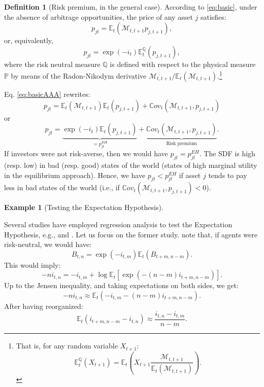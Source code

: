 \documentclass[
  12pt,
]{book}
\theoremstyle{definition}
\newtheorem{definition}{Definition}[chapter]
\theoremstyle{definition}
\newtheorem{example}{Example}[chapter]
\theoremstyle{definition}
\theoremstyle{definition}
\theoremstyle{remark}
\begin{document}
\begin{definition}[Risk premium, in the general case]
\protect\hypertarget{def:RPremium}{}\label{def:RPremium}According to \eqref{eq:basic}, under the absence of arbitrage opportunities, the price of any asset \(j\) satisfies:
\begin{equation}
p_{jt} = \mathbb{E}_t(\mathcal{M}_{t,t+1} p_{j,t+1}),\label{eq:basicAAA}
\end{equation}
or, equivalently,
\[
p_{jt} = \exp(-i_t)\mathbb{E}^{\mathbb{Q}}_t(p_{j,t+1}),
\]
where the risk neutral measure \(\mathbb{Q}\) is defined with respect to the physical measure \(\mathbb{P}\) by means of the Radon-Nikodym derivative \(\mathcal{M}_{t,t+1}\big/\mathbb{E}_t(\mathcal{M}_{t,t+1})\).\footnote{That is, for any random variable \(X_{t+1}\):
  \[
  \mathbb{E}^{\mathbb{Q}}_t(X_{t+1})=\mathbb{E}_t\left(X_{t+1}\frac{\mathcal{M}_{t,t+1}}{\mathbb{E}_t(\mathcal{M}_{t,t+1})}\right).
  \]}

Eq. \eqref{eq:basicAAA} rewrites:
\[
p_{jt} =  \mathbb{E}_t(\mathcal{M}_{t,t+1})\mathbb{E}_t( p_{j,t+1}) + \mathbb{C}ov_t(\mathcal{M}_{t,t+1}, p_{j,t+1})
\]
or
\begin{equation}
p_{jt} = \underbrace{\exp(-i_t)\mathbb{E}_t( p_{j,t+1})}_{=p^{EH}_{jt}} + \underbrace{\mathbb{C}ov_t(\mathcal{M}_{t,t+1}, p_{j,t+1})}_{\mbox{Risk premium}}.\label{eq:CovRP}
\end{equation}
If investors were not risk-averse, then we would have \(p_{jt} = p^{EH}_{jt}\). The SDF is high (resp. low) in bad (resp. good) states of the world (states of high marginal utility in the equilibrium approach). Hence, we have \(p_{jt}< p^{EH}_{jt}\) if asset \(j\) tends to pay less in bad states of the world (i.e., if \(\mathbb{C}ov_t(\mathcal{M}_{t,t+1}, p_{j,t+1})<0\)).
\end{definition}

\begin{example}[Testing the Expectation Hypothesis]
\protect\hypertarget{exm:TestingEH}{}\label{exm:TestingEH}

Several studies have employed regression analysis to test the Expectation Hypothesis, e.g., \citet{Campbell_Shiller_1991} and \citet{Cochrane_Piazzesi_2005}. Let us focus on the former study. \citet{Campbell_Shiller_1991} note that, if agents were risk-neutral, we would have:
\[
B_{t,n} = \exp(-i_{t,m})\mathbb{E}_t(B_{t+m,n-m}).
\]
This would imply:
\[
-n i_{t,n} = -i_{t,m} + \log \mathbb{E}_t[\exp(-(n-m) i_{t+m,n-m})].
\]
Up to the Jensen inequality, and taking expectations on both sides, we get:
\[
-n i_{t,n} \approx \mathbb{E}_t(-i_{t,m} -(n-m) i_{t+m,n-m}).
\]
After having reorganized:
\begin{equation}
\mathbb{E}_t(i_{t+m,n-m}-i_{t,n}) \approx \frac{i_{t,n}-i_{t,m}}{n-m}.\label{eq:CStheo}
\end{equation}

\end{example}
\end{document}
